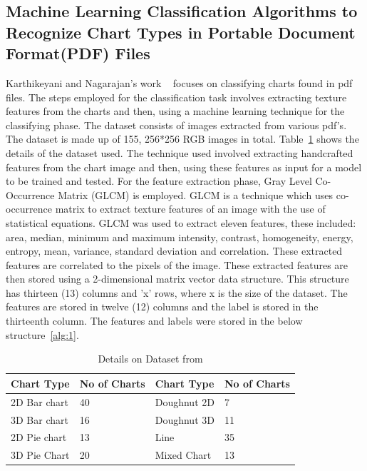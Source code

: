 \documentclass[12pt, a4paper,oneside]{report}
\begin{document}
\subsection{Machine Learning Classification Algorithms to Recognize Chart Types in Portable Document Format(PDF) Files}
Karthikeyani and Nagarajan's work ~\cite{karthikeyani2012machine} focuses on classifying charts found in pdf files. The steps employed for the classification task involves extracting texture features from the charts and then, using a machine learning technique for the classifying phase. The dataset consists of images extracted from various pdf's. The dataset is made up of 155, 256*256 RGB images in total. Table~\ref{table:pdf} shows the details of the dataset used.
The technique used involved extracting handcrafted features from the chart image and then, using these features as input for a model to be trained and tested.
For the feature extraction phase, Gray Level Co-Occurrence Matrix (GLCM) is employed. GLCM is a technique which uses co-occurrence matrix to extract texture features of an image with the use of statistical equations. GLCM was used to extract eleven features, these included: area, median, minimum and maximum intensity, contrast, homogeneity, energy, entropy, mean, variance, standard deviation and correlation. These extracted features are correlated to the pixels of the image. These extracted features are then stored using a 2-dimensional matrix vector data structure. This structure has thirteen (13) columns and 'x' rows, where x is the size of the dataset. The features are stored in twelve (12) columns and the label is stored in the thirteenth column. The features and labels were stored in the below structure~\ref{alg:1}.

\begin{table}[h]
	\centering {} \small
	\begin{tabular}{|p{3cm}|p{3cm}|p{3cm}|p{3cm}|}
		\hline
		Chart Type & No of Charts & Chart
		Type & No of Charts  \\ \hline
		2D Bar chart & 40 & Doughnut 2D & 7 \\ \hline
		3D Bar chart & 16 & Doughnut 3D & 11\\ \hline
		2D Pie chart & 13 & Line & 35 \\ \hline
		3D Pie Chart & 20 & Mixed Chart& 13 \\ \hline
	\end{tabular}
	\caption {Details on Dataset from \cite{karthikeyani2012machine} }	
	\label{table:pdf}
\end{table}
\end{document}
